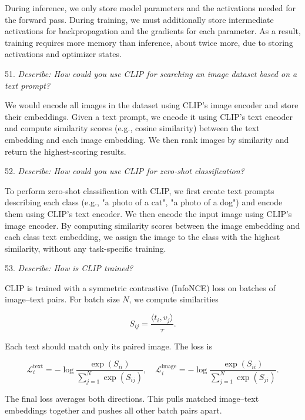 During inference, we only store model parameters and the activations needed for the forward pass. During training, we must additionally store intermediate activations for backpropagation and the gradients for each parameter. As a result, training requires more memory than inference, about twice more, due to storing activations and optimizer states.

\vspace{1cm}

51. \textit{Describe: How could you use CLIP for searching an image dataset based on a text prompt?}

We would encode all images in the dataset using CLIP’s image encoder and store their embeddings. Given a text prompt, we encode it using CLIP’s text encoder and compute similarity scores (e.g., cosine similarity) between the text embedding and each image embedding. We then rank images by similarity and return the highest-scoring results.

\vspace{1cm}

52. \textit{Describe: How could you use CLIP for zero-shot classification?}

To perform zero-shot classification with CLIP, we first create text prompts describing each class (e.g., "a photo of a cat", "a photo of a dog") and encode them using CLIP’s text encoder. We then encode the input image using CLIP’s image encoder. By computing similarity scores between the image embedding and each class text embedding, we assign the image to the class with the highest similarity, without any task-specific training.

\vspace{1cm}

53. \textit{Describe: How is CLIP trained?}

CLIP is trained with a symmetric contrastive (InfoNCE) loss on batches of image–text pairs. For batch size $N$, we compute similarities

\[
S_{ij} = \frac{\langle t_i, v_j \rangle}{\tau}.
\]

Each text should match only its paired image. The loss is

\[
\mathcal{L}_i^{\text{text}}
=
- \log
\frac{\exp(S_{ii})}
{\sum_{j=1}^{N} \exp(S_{ij})},
\quad
\mathcal{L}_i^{\text{image}}
=
- \log
\frac{\exp(S_{ii})}
{\sum_{j=1}^{N} \exp(S_{ji})}.
\]

The final loss averages both directions. This pulls matched image–text embeddings together and pushes all other batch pairs apart.

